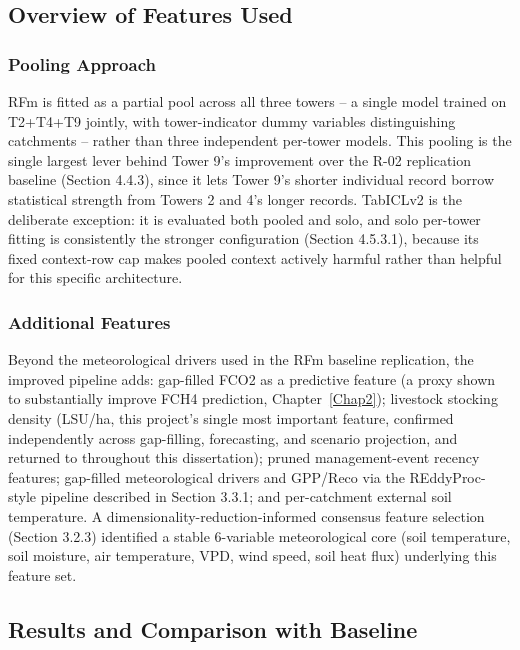 \subsection{Overview of Features Used}

\subsubsection{Pooling Approach}

RFm is fitted as a partial pool across all three towers -- a single model trained on T2+T4+T9
jointly, with tower-indicator dummy variables distinguishing catchments -- rather than three
independent per-tower models. This pooling is the single largest lever behind Tower 9's
improvement over the R-02 replication baseline (Section 4.4.3), since it lets Tower 9's shorter
individual record borrow statistical strength from Towers 2 and 4's longer records. TabICLv2 is the
deliberate exception: it is evaluated both pooled and solo, and solo per-tower fitting is
consistently the stronger configuration (Section 4.5.3.1), because its fixed context-row cap makes
pooled context actively harmful rather than helpful for this specific architecture.

\subsubsection{Additional Features}

Beyond the meteorological drivers used in the RFm baseline replication, the improved pipeline adds:
gap-filled FCO2 as a predictive feature (a proxy shown to substantially improve FCH4 prediction,
Chapter~\ref{Chap2}); livestock stocking density (LSU/ha, this project's single most important
feature, confirmed independently across gap-filling, forecasting, and scenario projection, and
returned to throughout this dissertation); pruned management-event recency features; gap-filled
meteorological drivers and GPP/Reco via the REddyProc-style pipeline described in Section 3.3.1;
and per-catchment external soil temperature. A dimensionality-reduction-informed consensus feature
selection (Section 3.2.3) identified a stable 6-variable meteorological core (soil temperature,
soil moisture, air temperature, VPD, wind speed, soil heat flux) underlying this feature set.

\subsection{Results and Comparison with Baseline}

